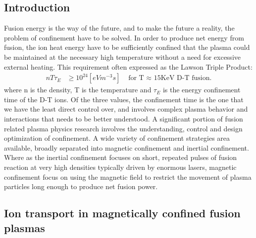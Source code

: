 \begin{refsection}

\chapter{Introduction}

Fusion energy is the way of the future, and to make the future a reality, the problem of confinement have to be solved. 
In order to produce net energy from fusion, the ion heat energy have to be sufficiently confined that the plasma could be maintained at the necessary high temperature without a need for excessive external heating. This requirement often expressed as the Lawson Triple Product:
\begin{align}
    nT\tau_{E} &\geq 10^{24} [eV m^{-3}s] &\text{  for T $\approx$ 15KeV D-T fusion.}
\end{align}
where n is the density, T is the temperature and $\tau_{E}$ is the energy confinement time of the D-T ions. Of the three values, the confinement time is the one that we have the least direct control over, and involves complex plasma behavior and interactions that needs to be better understood. A significant portion of fusion related plasma physics research involves the understanding, control and design optimization of confinement. A wide variety of confinement strategies area available, broadly separated into magnetic confinement and inertial confinement. Where as the inertial confinement focuses on short, repeated pulses of fusion reaction at very high densities typically driven by enormous lasers, magnetic confinement focus on using the magnetic field to restrict the movement of plasma particles long enough to produce net fusion power. 

\section{Ion transport in magnetically confined fusion plasmas}


\end{refsection}
